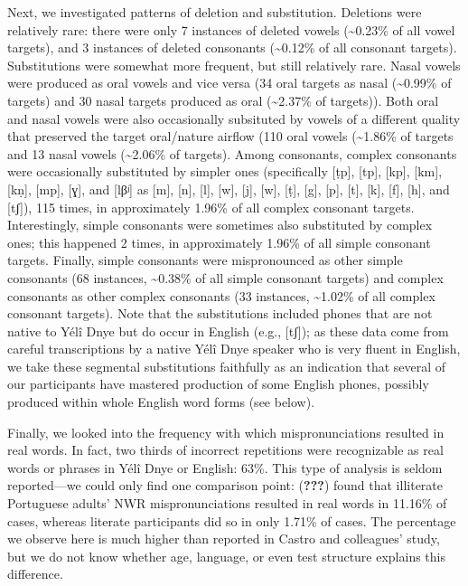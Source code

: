 \documentclass[english,,man,floatsintext]{apa6}
\begin{document}
Next, we investigated patterns of deletion and substitution. Deletions
were relatively rare: there were only 7 instances of deleted vowels
(\textasciitilde{}0.23\% of all vowel targets), and 3 instances of
deleted consonants (\textasciitilde{}0.12\% of all consonant targets).
Substitutions were somewhat more frequent, but still relatively rare.
Nasal vowels were produced as oral vowels and vice versa (34 oral
targets as nasal (\textasciitilde{}0.99\% of targets) and 30 nasal
targets produced as oral (\textasciitilde{}2.37\% of targets)). Both
oral and nasal vowels were also occasionally subsituted by vowels of a
different quality that preserved the target oral/nature airflow (110
oral vowels (\textasciitilde{}1.86\% of targets and 13 nasal vowels
(\textasciitilde{}2.06\% of targets). Among consonants, complex
consonants were occasionally substituted by simpler ones (specifically
{[}ṭp{]}, {[}tp{]}, {[}kp{]}, {[}km{]}, {[}kṇ{]}, {[}mp{]}, {[}ɣ{]}, and
{[}lβʲ{]} as {[}m{]}, {[}n{]}, {[}l{]}, {[}w{]}, {[}j{]}, {[}w{]},
{[}ṭ{]}, {[}g{]}, {[}p{]}, {[}t{]}, {[}k{]}, {[}f{]}, {[}h{]}, and
{[}tʃ{]}), 115 times, in approximately 1.96\% of all complex consonant
targets. Interestingly, simple consonants were sometimes also
substituted by complex ones; this happened 2 times, in approximately
1.96\% of all simple consonant targets. Finally, simple consonants were
mispronounced as other simple consonants (68 instances,
\textasciitilde{}0.38\% of all simple consonant targets) and complex
consonants as other complex consonants (33 instances,
\textasciitilde{}1.02\% of all complex consonant targets). Note that the
substitutions included phones that are not native to Yélî Dnye but do
occur in English (e.g., {[}tʃ{]}); as these data come from careful
transcriptions by a native Yélî Dnye speaker who is very fluent in
English, we take these segmental substitutions faithfully as an
indication that several of our participants have mastered production of
some English phones, possibly produced within whole English word forms
(see below).

Finally, we looked into the frequency with which mispronunciations
resulted in real words. In fact, two thirds of incorrect repetitions
were recognizable as real words or phrases in Yélî Dnye or English:
63\%. This type of analysis is seldom reported---we could only find one
comparison point: ({\textbf{???}}) found that illiterate Portuguese
adults' NWR mispronunciations resulted in real words in 11.16\% of
cases, whereas literate participants did so in only 1.71\% of cases. The
percentage we observe here is much higher than reported in Castro and
colleagues' study, but we do not know whether age, language, or even
test structure explains this difference.
\end{document}

